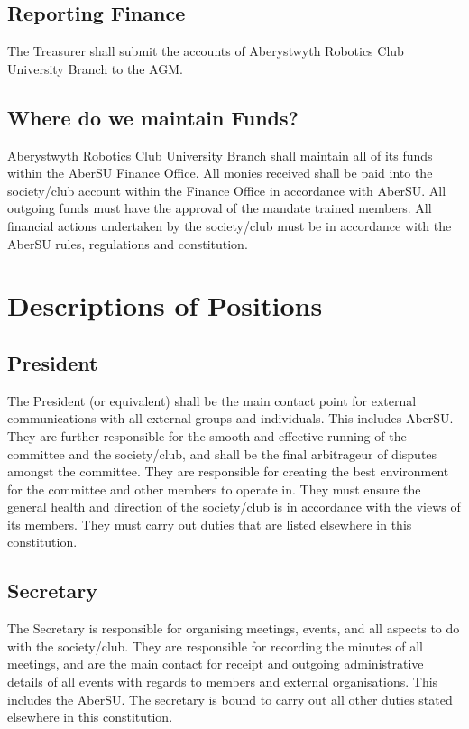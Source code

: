 \documentclass[a4paper,11pt]{article}
\begin{document}
\subsection{Reporting Finance}
The Treasurer shall submit the accounts of Aberystwyth Robotics Club University Branch to the AGM.

\subsection{Where do we maintain Funds?}
Aberystwyth Robotics Club University Branch shall maintain all of its funds within the AberSU Finance Office. All monies received shall be paid into the society/club account within the Finance Office in accordance with AberSU. All outgoing funds must have the approval of the mandate trained members.\newline
All financial actions undertaken by the society/club must be in accordance with the AberSU rules, regulations and constitution.

\section{Descriptions of Positions}
\subsection{President}
The President (or equivalent) shall be the main contact point for external communications with
all external groups and individuals. This includes AberSU. They are further responsible for the smooth and effective running of the committee and the society/club, and shall be the final arbitrageur of disputes amongst the committee. They are responsible for creating the best environment for the committee and other members to operate in. They must ensure the general health and direction of the society/club is in accordance with the views of its members. They must carry out duties that are listed elsewhere in this constitution.

\subsection{Secretary}
The Secretary is responsible for organising meetings, events, and all aspects to do with the society/club. They are responsible for recording the minutes of all meetings, and are the main contact for receipt and outgoing administrative details of all events with regards to members and external organisations. This includes the AberSU. The secretary is bound to carry out all other duties stated elsewhere in this constitution.
\end{document}
